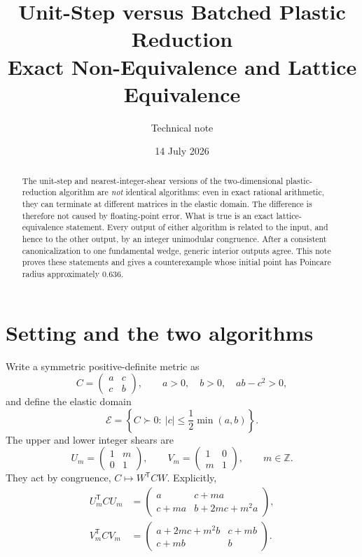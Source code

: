 \documentclass[11pt]{article}
\title{Unit-Step versus Batched Plastic Reduction\\
\large Exact Non-Equivalence and Lattice Equivalence}
\author{Technical note}
\date{14 July 2026}
\newcommand{\Eset}{\mathcal{E}}
\newcommand{\trans}{\mathsf{T}}
\begin{document}
\maketitle

\begin{abstract}
The unit-step and nearest-integer-shear versions of the two-dimensional
plastic-reduction algorithm are \emph{not} identical algorithms: even in exact
rational arithmetic, they can terminate at different matrices in the elastic
domain.  The difference is therefore not caused by floating-point error.
What is true is an exact lattice-equivalence statement.  Every output of either
algorithm is related to the input, and hence to the other output, by an integer
unimodular congruence.  After a consistent canonicalization to one fundamental
wedge, generic interior outputs agree.  This note proves these statements and
gives a counterexample whose initial point has Poincare radius approximately
$0.636$.
\end{abstract}

\section{Setting and the two algorithms}

Write a symmetric positive-definite metric as
\[
 C=\begin{pmatrix}a&c\\c&b\end{pmatrix},\qquad
 a>0,\quad b>0,\quad ab-c^2>0,
\]
and define the elastic domain
\[
 \Eset
 =\left\{C\succ0:\ |c|\leq\frac12\min(a,b)\right\}.
\]
The upper and lower integer shears are
\[
 U_m=\begin{pmatrix}1&m\\0&1\end{pmatrix},
 \qquad
 V_m=\begin{pmatrix}1&0\\m&1\end{pmatrix},
 \qquad m\in\mathbb{Z}.
\]
They act by congruence, $C\mapsto W^\trans C W$.  Explicitly,
\begin{align}
 U_m^\trans C U_m
 &=
 \begin{pmatrix}
 a & c+ma\\
 c+ma & b+2mc+m^2a
 \end{pmatrix}, \label{eq:U-update}\\
 V_m^\trans C V_m
 &=
 \begin{pmatrix}
 a+2mc+m^2b & c+mb\\
 c+mb & b
 \end{pmatrix}. \label{eq:V-update}
\end{align}
\end{document}
